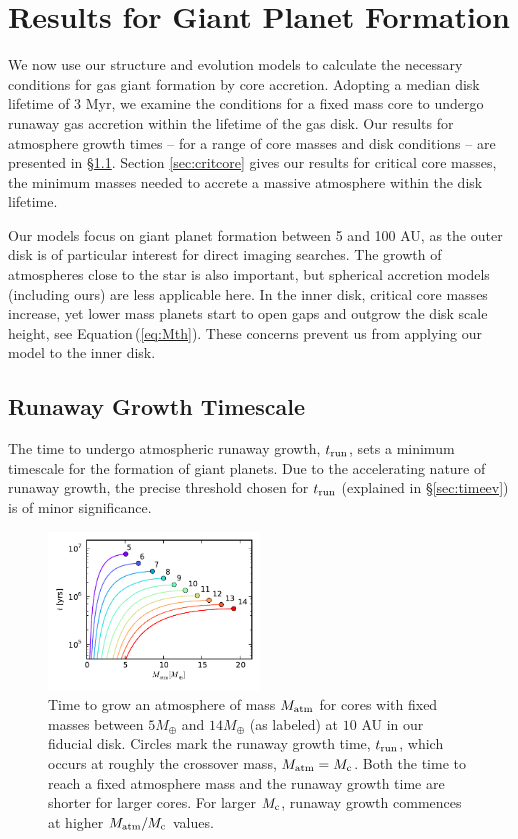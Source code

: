\documentclass[apj, numberedappendix]{emulateapj}
\newcommand{\Eq}[1]{Equation\,(\ref{#1})}
\newcommand{\co}{_{\rm c}}
\begin{document}
\section{Results for Giant Planet Formation}
\label{sec:critical}

We now use our structure and evolution models to calculate the necessary conditions for gas giant formation by core accretion.   Adopting a median disk lifetime of 3 Myr, we examine the conditions for a fixed mass core to undergo runaway gas accretion within the lifetime of the gas disk.  Our results for atmosphere growth times -- for a range of core masses and disk conditions -- are presented in \S\ref{sec:tcross}.  Section \ref{sec:critcore} gives our results for critical core masses, the minimum masses needed to accrete a massive atmosphere within the disk lifetime.

Our models focus on giant planet formation between 5 and 100 AU, as the outer disk is of particular interest for direct imaging searches.   The growth of atmospheres close to the star is also important, but spherical accretion models (including ours) are less applicable here.  In the inner disk, critical core masses increase, yet lower mass planets start to open gaps and outgrow the disk scale height, see \Eq{eq:Mth}.  These concerns prevent us from applying our model to the inner disk. 


\subsection{Runaway Growth Timescale}
\label{sec:tcross}
The time to undergo atmospheric runaway growth, $t_{\rm run}$, sets a minimum timescale for the formation of giant planets.  Due to the accelerating nature of runaway growth, the precise threshold chosen for $t_{\rm run}$ (explained in \S\ref{sec:timeev}) is of minor significance.

\begin{figure}[tb]
\hspace{-.1in}
\includegraphics[width=0.5\textwidth]{../../figs/ModelAtmospheres/RadSelfGravPoly/PaperFigs/cumul_coolingtime_vs_Matm_10au_mu235.pdf}
\caption{Time to grow an atmosphere of mass $M_{\rm{atm}}$ for cores with fixed masses between $5 M_{\oplus}$ and $14 M_{\oplus}$ (as labeled) at $10$ AU in our fiducial disk. Circles mark the runaway growth time, $t_{\rm run}$, which occurs at roughly the crossover mass, $M_{\rm{atm}} = M\co$.  Both the time to reach a fixed atmosphere mass and the runaway growth time are shorter for larger cores. For larger $M\co$, runaway growth commences at higher $M_{\rm atm}/M\co$ values.}
\label{fig:tvsM}
\end{figure}
\end{document}
